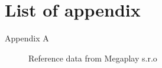 
\chapter*{List of appendix}

\begin{description}
	\item[Appendix A] Reference data from Megaplay s.r.o
\end{description}
